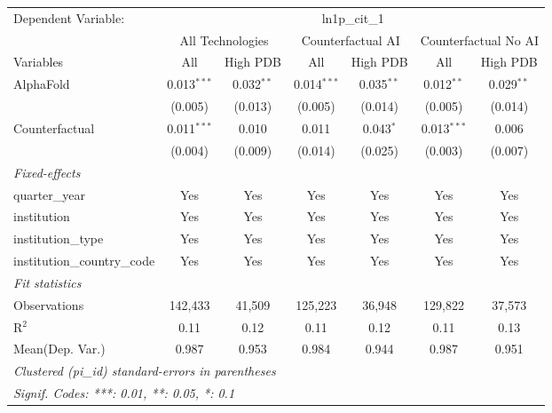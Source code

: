 \begingroup
\centering
\begin{tabular}{lcccccc}
   \tabularnewline \midrule \midrule
   Dependent Variable: & \multicolumn{6}{c}{ln1p\_cit\_1}\\
 & \multicolumn{2}{c}{All Technologies} & \multicolumn{2}{c}{Counterfactual AI} & \multicolumn{2}{c}{Counterfactual No AI} \\
\cmidrule(lr){1-1}\cmidrule(lr){2-3} \cmidrule(lr){4-5} \cmidrule(lr){6-7}
Variables & \multicolumn{1}{c}{All} & \multicolumn{1}{c}{High PDB} & \multicolumn{1}{c}{All} & \multicolumn{1}{c}{High PDB} & \multicolumn{1}{c}{All} & \multicolumn{1}{c}{High PDB} \\
\cmidrule(lr){1-1}\cmidrule(lr){2-2} \cmidrule(lr){3-3} \cmidrule(lr){4-4} \cmidrule(lr){5-5} \cmidrule(lr){6-6} \cmidrule(lr){7-7}
   AlphaFold                    & 0.013$^{***}$ & 0.032$^{**}$ & 0.014$^{***}$ & 0.035$^{**}$ & 0.012$^{**}$  & 0.029$^{**}$\\   
                                & (0.005)       & (0.013)      & (0.005)       & (0.014)      & (0.005)       & (0.014)\\   
   Counterfactual               & 0.011$^{***}$ & 0.010        & 0.011         & 0.043$^{*}$  & 0.013$^{***}$ & 0.006\\   
                                & (0.004)       & (0.009)      & (0.014)       & (0.025)      & (0.003)       & (0.007)\\   
   \midrule
   \emph{Fixed-effects}\\
   quarter\_year                & Yes           & Yes          & Yes           & Yes          & Yes           & Yes\\  
   institution                  & Yes           & Yes          & Yes           & Yes          & Yes           & Yes\\  
   institution\_type            & Yes           & Yes          & Yes           & Yes          & Yes           & Yes\\  
   institution\_country\_code   & Yes           & Yes          & Yes           & Yes          & Yes           & Yes\\  
   \midrule
   \emph{Fit statistics}\\
   Observations                 & 142,433       & 41,509       & 125,223       & 36,948       & 129,822       & 37,573\\  
   R$^2$                        & 0.11          & 0.12         & 0.11          & 0.12         & 0.11          & 0.13\\  
Mean(Dep. Var.) & 0.987 & 0.953 & 0.984 & 0.944 & 0.987 & 0.951 \\
   \midrule \midrule
   \multicolumn{7}{l}{\emph{Clustered (pi\_id) standard-errors in parentheses}}\\
   \multicolumn{7}{l}{\emph{Signif. Codes: ***: 0.01, **: 0.05, *: 0.1}}\\
\end{tabular}
\par\endgroup
